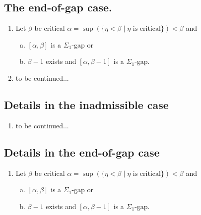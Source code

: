 \documentclass[12pt,a4paper]{article}
\theoremstyle{nicestyle}
\begin{document}
\subsection{The end-of-gap case.}
\begin{enumerate}
\item Let $\beta$ be critical
  $\alpha = \sup(\{ \eta < \beta \mid \eta \text{ is critical} \}) <
  \beta$ and
  \begin{enumerate}[(a)]
  \item $[\alpha,\beta]$ is a $\Sigma_1$-gap or
  \item $\beta -1$ exists and $[\alpha, \beta-1]$ is a $\Sigma_1$-gap.
  \end{enumerate}
\item to be continued...
\end{enumerate}

\subsection{Details in the inadmissible case}
\begin{enumerate}
\item to be continued...
\end{enumerate}
\subsection{Details in the end-of-gap case}
\begin{enumerate}
\item Let $\beta$ be critical
  $\alpha = \sup(\{ \eta < \beta \mid \eta \text{ is critical} \}) <
  \beta$ and
  \begin{enumerate}[(a)]
  \item $[\alpha,\beta]$ is a $\Sigma_1$-gap or
  \item $\beta -1$ exists and $[\alpha, \beta-1]$ is a $\Sigma_1$-gap.
  \end{enumerate}
\end{enumerate}
% 
% 
\end{document}

